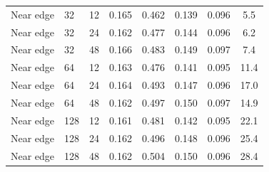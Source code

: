 \documentclass[referee]{gji}
\begin{document}
\begin{longtable}{@{}llcccccc@{}}
Near edge & 32 & 12 & 0.165 & 0.462 & 0.139 & 0.096 & 5.5 \\
Near edge & 32 & 24 & 0.162 & 0.477 & 0.144 & 0.096 & 6.2 \\
Near edge & 32 & 48 & 0.166 & 0.483 & 0.149 & 0.097 & 7.4 \\
Near edge & 64 & 12 & 0.163 & 0.476 & 0.141 & 0.095 & 11.4 \\
Near edge & 64 & 24 & 0.164 & 0.493 & 0.147 & 0.096 & 17.0 \\
Near edge & 64 & 48 & 0.162 & 0.497 & 0.150 & 0.097 & 14.9 \\
Near edge & 128 & 12 & 0.161 & 0.481 & 0.142 & 0.095 & 22.1 \\
Near edge & 128 & 24 & 0.162 & 0.496 & 0.148 & 0.096 & 25.4 \\
Near edge & 128 & 48 & 0.162 & 0.504 & 0.150 & 0.096 & 28.4 \\
\end{longtable}
\normalsize

\label{lastpage}
\end{document}
